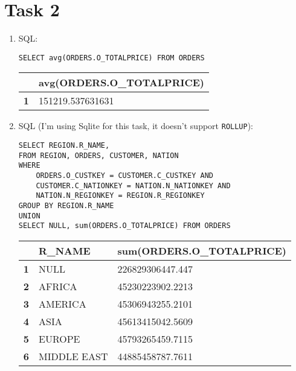 \documentclass{article}
\begin{document}
	\section*{Task 2}
	\begin{enumerate}[label=(\alph*)]
		\item SQL:
		\begin{lstlisting}[tabsize=2]
SELECT avg(ORDERS.O_TOTALPRICE) FROM ORDERS
		\end{lstlisting}
		\begin{center}
			\begin{tabular}{l|l}
				& \textbf{avg(ORDERS.O\_TOTALPRICE)} \\
				\hline
				\textbf{1} & 151219.537631631
			\end{tabular}
		\end{center}
		\item SQL (I'm using Sqlite for this task, it doesn't support \texttt{ROLLUP}):
		\begin{lstlisting}[tabsize=2]
SELECT REGION.R_NAME,  
FROM REGION, ORDERS, CUSTOMER, NATION
WHERE 
	ORDERS.O_CUSTKEY = CUSTOMER.C_CUSTKEY AND 
	CUSTOMER.C_NATIONKEY = NATION.N_NATIONKEY AND 
	NATION.N_REGIONKEY = REGION.R_REGIONKEY 
GROUP BY REGION.R_NAME
UNION
SELECT NULL, sum(ORDERS.O_TOTALPRICE) FROM ORDERS
		\end{lstlisting}
		\begin{center}
			\begin{tabular}{l|l|l}
				& \textbf{R\_NAME} &\textbf{sum(ORDERS.O\_TOTALPRICE)} \\
				\hline
				\textbf{1} & NULL & 226829306447.447 \\
				\hline
				\textbf{2} & AFRICA & 45230223902.2213 \\
				\hline
				\textbf{3} & AMERICA & 45306943255.2101 \\
				\hline
				\textbf{4} & ASIA & 45613415042.5609 \\
				\hline
				\textbf{5} & EUROPE & 45793265459.7115 \\
				\hline
				\textbf{6} & MIDDLE EAST & 44885458787.7611 \\
			\end{tabular}
		\end{center}
	\end{enumerate}
\end{document}
